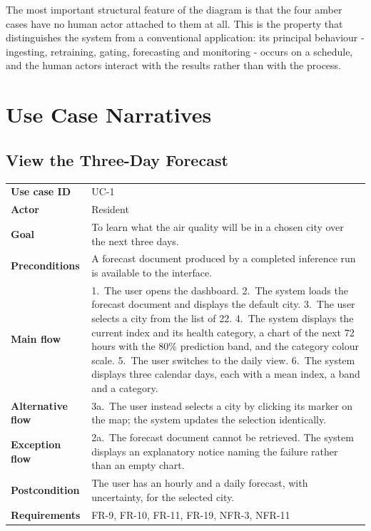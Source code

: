 
The most important structural feature of the diagram is that the four amber cases
have no human actor attached to them at all. This is the property that
distinguishes the system from a conventional application: its principal behaviour
- ingesting, retraining, gating, forecasting and monitoring - occurs on a
schedule, and the human actors interact with the results rather than with the
process.

\section{Use Case Narratives}

\subsection{View the Three-Day Forecast}
\begin{xltabular}{\textwidth}{Q{2.9cm} Y}
\toprule
\bfseries Use case ID & UC-1 \\
\bfseries Actor & Resident \\
\bfseries Goal & To learn what the air quality will be in a chosen city over the
next three days. \\
\bfseries Preconditions & A forecast document produced by a completed inference
run is available to the interface. \\
\bfseries Main flow & 1.~The user opens the dashboard. 2.~The system loads the
forecast document and displays the default city. 3.~The user selects a city from
the list of 22. 4.~The system displays the current index and its health
category, a chart of the next 72 hours with the 80\% prediction band, and the
category colour scale. 5.~The user switches to the daily view. 6.~The system
displays three calendar days, each with a mean index, a band and a category. \\
\bfseries Alternative flow & 3a.~The user instead selects a city by clicking its
marker on the map; the system updates the selection identically. \\
\bfseries Exception flow & 2a.~The forecast document cannot be retrieved. The
system displays an explanatory notice naming the failure rather than an empty
chart. \\
\bfseries Postcondition & The user has an hourly and a daily forecast, with
uncertainty, for the selected city. \\
\bfseries Requirements & FR-9, FR-10, FR-11, FR-19, NFR-3, NFR-11 \\
\bottomrule
\end{xltabular}

